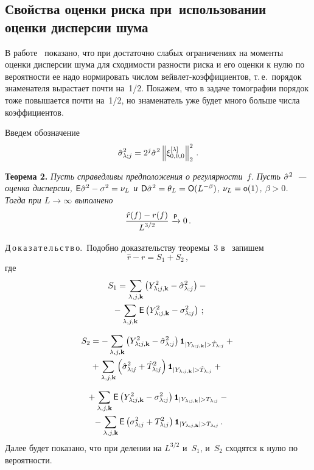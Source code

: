 \begin{multicols}{2}
\section{Свойства оценки риска при~использовании оценки дисперсии шума}

В работе~\cite{MarkinShestakovConsist} показано, что при достаточно слабых ограничениях 
на моменты оценки дисперсии шума для сходимости разности риска и его оценки к нулю по 
вероятности ее надо нормировать числом вейвлет-коэффициентов, т.\,е.\ порядок знаменателя 
вырастает почти на~1/2. Покажем, что в задаче томографии порядок тоже повышается почти на~1/2, 
но знаменатель уже будет много больше числа коэффициентов.

Введем обозначение
\begin{equation*}
\hat\sigma^2_{\lambda;j} = 2^j \hat\sigma^2 \left\|\xi^{[\lambda]}_{0,0,0}\right\|_2^2\,.
\end{equation*}

\medskip
\noindent
\textbf{Теорема 2.} \textit{Пусть справедливы предположения о регулярности~$f$. 
Пусть $\hat\sigma^2$~--- оценка дисперсии, ${\sf E}\hat\sigma^2-\sigma^2=\nu_L$ и 
${\sf D}\hat\sigma^2=\theta_L=\textsf{O}(L^{-\beta})$, $\nu_L=\textsf{o}(1)$, $\beta>0$. 
Тогда при $L\rightarrow\infty$ выполнено}
\begin{equation}
\label{eq_ConsistTomo32}
\displaystyle\frac{\displaystyle \hat r(f)-r(f)\mathstrut}{\displaystyle L^{3/2}\mathstrut} \xrightarrow{\textsf{P}} 0\,.
\end{equation}

\medskip

\noindent
Д\,о\,к\,а\,з\,а\,т\,е\,л\,ь\,с\,т\,в\,о.\
Подобно доказательству теоремы~3 в~\cite{MarkinShestakovConsist} запишем
\begin{equation*}
\hat r-r = S_1 + S_2\,,
\end{equation*}
где
\begin{multline}
S_1 = \sum\limits_{\lambda,j,\mathbf{k}}\left(Y_{\lambda;j,\mathbf{k}}^2-\hat\sigma^2_{\lambda;j}\right) -{}\\
{}- \sum\limits_{\lambda,j,\mathbf{k}}{\sf E}\left(Y_{\lambda;j,\mathbf{k}}^2-\sigma_{\lambda;j}^2\right)\,; \label{eq_riskSplitSoTomo}
\end{multline}

\vspace*{-6pt}

\noindent
\begin{multline*}
S_2 = - \sumljk\left(\Yljk^2-\hslj\right)\indYjkghTj +{}\\
\!\!{}+ \sumljk\left(\hslj+\hTlj^2\right)\indYjkghTj +{} 
\end{multline*}

\noindent
\begin{multline}
{}+ \sumljk\e\left(\Yljk^2-\slj\right)\indYjkgTj -{}\\
{}- \sumljk\e\left(\slj+\Tlj^2\right)\indYjkgTj\,.
\label{eq_riskSplitStTomo}
\end{multline}
Далее будет показано, что при делении на $L^{3/2}$ и~$S_1$, и~$S_2$ сходятся к нулю по вероятности.


\end{multicols}
